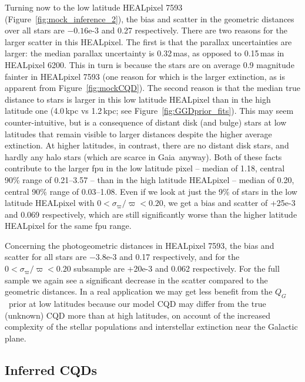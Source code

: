 \documentclass[twocolumn]{aastex62}
\providecommand{\gaia}{Gaia}
\providecommand{\QG}{\ensuremath{Q_G}}
\providecommand{\parallax}{\ensuremath{\varpi}}
\providecommand{\sigparallax}{\ensuremath{\sigma_{\varpi}}}
\providecommand{\fpu}{\ensuremath{\sigparallax/\parallax}}
\begin{document}
Turning now to the low latitude HEALpixel 7593 (Figure~\ref{fig:mock_inference_2}), the bias and scatter in the geometric distances over all stars are $-0.16$e-3 and 0.27 respectively. There are two reasons for the larger scatter in this HEALpixel. 
The first is that the parallax uncertainties are larger: the median
parallax uncertainty is 0.32\,mas, as opposed to 0.15\,mas in HEALpixel 6200.  This in turn is because the stars are on average 0.9 magnitude fainter in 
HEALpixel 7593 (one reason for which is the larger extinction, as is apparent from Figure~\ref{fig:mockCQD}). 
The second reason is that the median true distance to stars is larger in this low latitude HEALpixel than in the high latitude one (4.0\,kpc vs 1.2\,kpc; see Figure~\ref{fig:GGDprior_fits}). This may seem counter-intuitive, but is a consequence of distant disk (and bulge) stars at low latitudes that remain visible to larger distances despite the higher average extinction. At higher latitudes, in contrast, there are no distant disk stars, and hardly any halo stars (which are scarce in \gaia\ anyway).
Both of these facts contribute to the larger fpu in the low latitude pixel -- median of 1.18, central 90\% range of 0.21--3.57 -- than in the high latitude HEALpixel -- median of 0.20, central 90\% range of 0.03--1.08.
Even if we look at just the 9\% of stars in the low latitude HEALpixel with $0 < \fpu < 0.20$, we get a bias and scatter of +25e-3 and 0.069 respectively, which are still significantly worse than the higher latitude HEALpixel for the same fpu range.

Concerning the photogeometric distances in HEALpixel 7593, the bias and scatter for all stars are $-3.8$e-3 and 0.17 respectively, and for the $0 < \fpu < 0.20$ subsample are +20e-3 and 0.062 respectively. For the full sample we again see a significant decrease in the scatter compared to the geometric distances. In a real application we may get less benefit from the \QG\ prior at low latitudes because our model CQD may differ from the true (unknown) CQD more than at high latitudes, on account of the increased complexity of the stellar populations and interstellar extinction near the Galactic plane. 


\subsection{Inferred CQDs}\label{sec:mock_inferered_CQDs}
\end{document}
